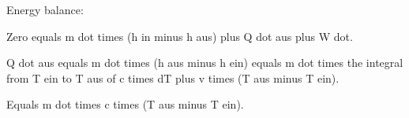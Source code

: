 Energy balance:

Zero equals m dot times (h in minus h aus) plus Q dot aus plus W dot.

Q dot aus equals m dot times (h aus minus h ein) equals m dot times the integral from T ein to T aus of c times dT plus v times (T aus minus T ein).

Equals m dot times c times (T aus minus T ein).